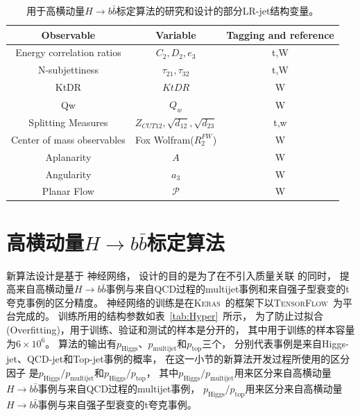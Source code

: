 \begin{table}[ht]
\caption{用于高横动量$H\rightarrow b\bar{b}$标定算法的研究和设计的部分LR-jet结构变量。}
\begin{center}
\begin{adjustbox}{width=\columnwidth,center}
\begin{tabular}{c|c|c}
    \hline
    \hline
    Observable & Variable & Tagging and reference \\
    \hline  
    Energy correlation ratios & $C_2,D_2,e_3$ & t,W\cite{JSS1,JSS2} \\
    \hline  
    N-subjettiness & $\tau_{21},\tau_{32}$ & t,W\cite{JSS3,JSS4} \\
    \hline  
    KtDR & $KtDR$ & W\cite{JSS14} \\
    \hline  
    Qw & $Q_w$ & W\cite{JSS8} \\
    \hline  
    Splitting Measures & $Z_{CUT12},\sqrt{d_{12}},\sqrt{d_{23}}$ & t,w\cite{JSS8,JSS10} \\ 
    \hline  
    Center of mass observables & Fox Wolfram($R_2^{FW}$) & W\cite{JSS5}  \\
    \hline  
    Aplanarity & $A$ & W\cite{JSS6} \\
     \hline  
    Angularity & $a_3$ & W\cite{JSS13} \\
    \hline  
    Planar Flow & $\mathcal{P}$& W\cite{JSS11} \\
    \hline
    \hline
\end{tabular}
\end{adjustbox}
\end{center}
\label{tab:JS}
\end{table}




\section{高横动量$H\rightarrow b\bar{b}$标定算法}
\label{sec:XbbTagger}


新算法设计是基于%
神经网络，
设计的目的是为了在不引入质量关联
的同时，
提高来自高横动量$H\rightarrow b\bar{b}$事例与来自QCD过程的multijet事例和来自强子型衰变的t夸克事例的区分精度。
神经网络的训练是在\textsc{Keras}~\cite{Chollet:2015}的框架下以\textsc{TensorFlow}~\cite{Tensorflow:2015}为平台完成的。
训练所用的结构参数如表~\ref{tab:Hyper}~所示，
为了防止过拟合(Overfitting)，用于训练、验证和测试的样本是分开的，
其中用于训练的样本容量为$6\times 10^{6}$。
算法的输出有$p_{\text{Higgs}}$、$p_{\text{multijet}}$和$p_{\text{top}}$三个，
分别代表事例是来自Higgs-jet、QCD-jet和Top-jet事例的概率，
在这一小节的新算法开发过程所使用的区分因子
是$p_{\text{Higgs}}/p_{\text{multijet}}$和$p_{\text{Higgs}}/p_{\text{top}}$，
其中$p_{\text{Higgs}}/p_{\text{multijet}}$用来区分来自高横动量$H\rightarrow b\bar{b}$事例与来自QCD过程的multijet事例，
$p_{\text{Higgs}}/p_{\text{top}}$用来区分来自高横动量$H\rightarrow b\bar{b}$事例与来自强子型衰变的t夸克事例。


